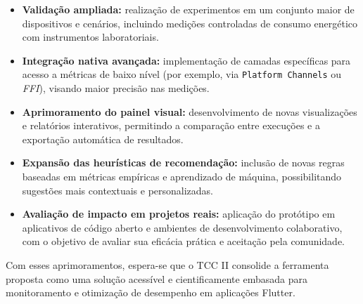 \documentclass[12pt,a4paper,oneside]{abntex2}
\begin{document}
\begin{itemize}
  \item \textbf{Validação ampliada:} realização de experimentos em um conjunto maior de dispositivos e cenários, incluindo medições controladas de consumo energético com instrumentos laboratoriais.
  
  \item \textbf{Integração nativa avançada:} implementação de camadas específicas para acesso a métricas de baixo nível (por exemplo, via \texttt{Platform Channels} ou \textit{FFI}), visando maior precisão nas medições.
  
  \item \textbf{Aprimoramento do painel visual:} desenvolvimento de novas visualizações e relatórios interativos, permitindo a comparação entre execuções e a exportação automática de resultados.
  
  \item \textbf{Expansão das heurísticas de recomendação:} inclusão de novas regras baseadas em métricas empíricas e aprendizado de máquina, possibilitando sugestões mais contextuais e personalizadas.
  
  \item \textbf{Avaliação de impacto em projetos reais:} aplicação do protótipo em aplicativos de código aberto e ambientes de desenvolvimento colaborativo, com o objetivo de avaliar sua eficácia prática e aceitação pela comunidade.
\end{itemize}

Com esses aprimoramentos, espera-se que o TCC II consolide a ferramenta proposta como uma solução acessível e cientificamente embasada para monitoramento e otimização de desempenho em aplicações Flutter.
\end{document}
